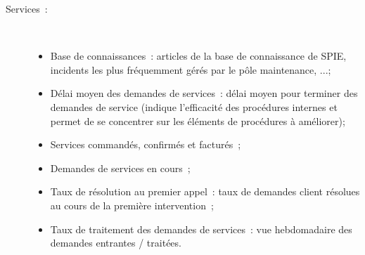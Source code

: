 \begin{description}
        \item[Services~:] ~ \\
            \begin{itemize}
                \item Base de connaissances~: articles de la base de connaissance de SPIE, incidents les plus fréquemment gérés par le pôle maintenance, ...;
                \item Délai moyen des demandes de services~: délai moyen pour terminer des demandes de service (indique l'efficacité des procédures internes et permet de se concentrer sur les éléments de procédures à améliorer);
                \item Services commandés, confirmés et facturés~;
                \item Demandes de services en cours~;
                \item Taux de résolution au premier appel~: taux de demandes client résolues au cours de la première intervention~;
                \item Taux de traitement des demandes de services~: vue hebdomadaire des demandes entrantes / traitées.
            \end{itemize}

    \end{description}
